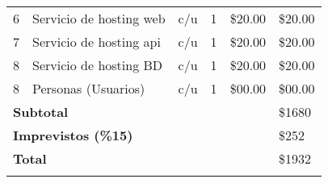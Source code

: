 \begin{ThreePartTable}
\begin{longtable}{c p{} c c p{} p{}}
		6                                               & Servicio de hosting web            & c/u             & 1                 & \$20.00                 & \$20.00              \\
		7                                               & Servicio de hosting api            & c/u             & 1                 & \$20.00                 & \$20.00              \\
		8                                               & Servicio de hosting BD             & c/u             & 1                 & \$20.00                 & \$20.00              \\
		8                                               & Personas (Usuarios)                & c/u             & 1                 & \$00.00                 & \$00.00              \\
		\midrule
		\multicolumn{5}{l}{\textbf{Subtotal}}           & \$1680                                                                                                                    \\
		\multicolumn{5}{l}{\textbf{Imprevistos (\%15)}} & \$252                                                                                                                     \\
		\multicolumn{5}{l}{\textbf{Total}}              & \$1932                                                                                                                    \\
		\bottomrule
		\insertTableNotes
	\end{longtable}
\end{ThreePartTable}
